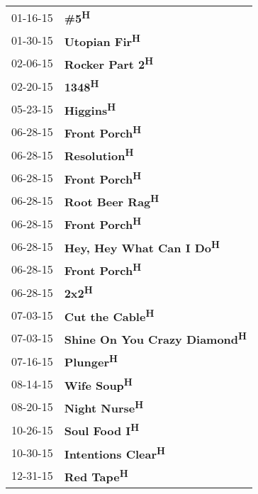 \begin{supertabular}{p{0.25\columnwidth}p{0.75\columnwidth}}
 01-16-15 &                         \textbf{\#5\textsuperscript{H}} \\
 01-30-15 &                 \textbf{Utopian Fir\textsuperscript{H}} \\
 02-06-15 &               \textbf{Rocker Part 2\textsuperscript{H}} \\
 02-20-15 &                        \textbf{1348\textsuperscript{H}} \\
 05-23-15 &                     \textbf{Higgins\textsuperscript{H}} \\
 06-28-15 &                 \textbf{Front Porch\textsuperscript{H}} \\
 06-28-15 &                  \textbf{Resolution\textsuperscript{H}} \\
 06-28-15 &                 \textbf{Front Porch\textsuperscript{H}} \\
 06-28-15 &               \textbf{Root Beer Rag\textsuperscript{H}} \\
 06-28-15 &                 \textbf{Front Porch\textsuperscript{H}} \\
 06-28-15 &      \textbf{Hey, Hey What Can I Do\textsuperscript{H}} \\
 06-28-15 &                 \textbf{Front Porch\textsuperscript{H}} \\
 06-28-15 &                         \textbf{2x2\textsuperscript{H}} \\
 07-03-15 &               \textbf{Cut the Cable\textsuperscript{H}} \\
 07-03-15 &  \textbf{Shine On You Crazy Diamond\textsuperscript{H}} \\
 07-16-15 &                     \textbf{Plunger\textsuperscript{H}} \\
 08-14-15 &                   \textbf{Wife Soup\textsuperscript{H}} \\
 08-20-15 &                 \textbf{Night Nurse\textsuperscript{H}} \\
 10-26-15 &                 \textbf{Soul Food I\textsuperscript{H}} \\
 10-30-15 &            \textbf{Intentions Clear\textsuperscript{H}} \\
 12-31-15 &                    \textbf{Red Tape\textsuperscript{H}} \\
\end{supertabular}

